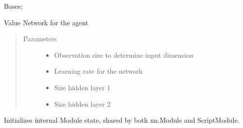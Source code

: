 \documentclass[letterpaper,10pt,english]{sphinxmanual}
\begin{document}
\begin{fulllineitems}
\label{\detokenize{agents.reinforcement_learning:agents.reinforcement_learning.ppo_masked.ValueNetwork}}
\sphinxAtStartPar
Bases: 

\sphinxAtStartPar
Value Network for the agent
\begin{quote}\begin{description}
\item[{Parameters}] \leavevmode\begin{itemize}
\item {} 
\sphinxAtStartPar
{} \textendash{} Observation size to determine input dimension

\item {} 
\sphinxAtStartPar
{} \textendash{} Learning rate for the network

\item {} 
\sphinxAtStartPar
{} \textendash{} Size hidden layer 1

\item {} 
\sphinxAtStartPar
{} \textendash{} Size hidden layer 2

\end{itemize}

\end{description}\end{quote}

\begin{fulllineitems}
\label{\detokenize{agents.reinforcement_learning:agents.reinforcement_learning.ppo_masked.ValueNetwork.__init__}}
\sphinxAtStartPar
Initializes internal Module state, shared by both nn.Module and ScriptModule.


\end{fulllineitems}
\end{fulllineitems}
\end{document}
